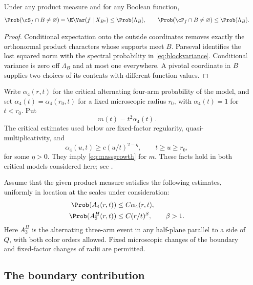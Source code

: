 \begin{lemma}\label{lem:blockvariance}
Under any product measure and for any Boolean function,
\begin{equation}\label{eq:blockvariance}
 \Prob(\cS_f\cap B\ne\varnothing)
 =\E\Var(f\mid X_{B^c})\le\Prob(\Lambda_B),
 \qquad
 \Prob(\cP_f\cap B\ne\varnothing)\le\Prob(\Lambda_B).
\end{equation}
\end{lemma}
\begin{proof}
Conditional expectation onto the outside coordinates removes exactly the orthonormal product characters whose supports meet $B$. Parseval identifies the lost squared norm with the spectral probability in \eqref{eq:blockvariance}. Conditional variance is zero off $\Lambda_B$ and at most one everywhere. A pivotal coordinate in $B$ supplies two choices of its contents with different function values.
\end{proof}

Write $\alpha_4(r,t)$ for the critical alternating four-arm probability of the model, and set $\alpha_4(t)=\alpha_4(r_0,t)$ for a fixed microscopic radius $r_0$, with $\alpha_4(t)=1$ for $t<r_0$. Put
\[
 m(t)=t^2\alpha_4(t).
\]
The critical estimates used below are fixed-factor regularity, quasi-multiplicativity, and
\begin{equation}\label{eq:armgap}
 \alpha_4(u,t)\ge c(u/t)^{2-\eta},\qquad t\ge u\ge r_0,
\end{equation}
for some $\eta>0$. They imply \eqref{eq:massgrowth} for $m$. These facts hold in both critical models considered here; see \cite[Section~2.2]{GPS}.

Assume that the given product measure satisfies the following estimates, uniformly in location at the scales under consideration:
\begin{align}
 \Prob(A_4(r,t))&\le C\alpha_4(r,t),\label{eq:armactual}\\
 \Prob(A_3^H(r,t))&\le C(r/t)^\beta,\qquad\beta>1.\label{eq:halfarm}
\end{align}
Here $A_3^H$ is the alternating three-arm event in any half-plane parallel to a side of $Q$, with both color orders allowed. Fixed microscopic changes of the boundary and fixed-factor changes of radii are permitted.

\subsection{The boundary contribution}

